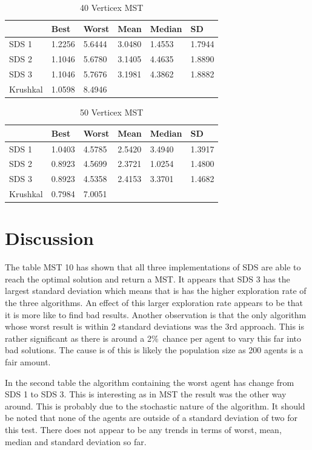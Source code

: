 \documentclass{AISB2008}
\begin{document}
{\begin{table}
\centering
\caption{40 Verticex MST}
\begin{tabular}{l|lllll}
	 	  & Best    & Worst    &   Mean  & Median & SD \\ \hline
SDS 1 & 1.2256	 & 5.6444  & 3.0480 & 1.4553 & 1.7944 \\
SDS 2 & 1.1046	 & 5.6780	& 3.1405 & 4.4635 & 1.8890 \\	
SDS 3 & 1.1046	 & 5.7676	& 3.1981 & 4.3862 & 1.8882 \\	
Krushkal      & 1.0598	 & 8.4946 \\
\end{tabular}
\end{table}

\begin{table}
\centering
\caption{50 Verticex MST}
\begin{tabular}{l|lllll}
	   & Best    & Worst    &   Mean  & Median & SD \\ \hline
SDS 1 &  1.0403 & 4.5785	& 2.5420	& 3.4940	& 1.3917 \\
SDS 2 & 0.8923	 & 4.5699	& 2.3721	& 1.0254	& 1.4800 \\	
SDS 3 & 0.8923	 & 4.5358	& 2.4153	& 3.3701	& 1.4682 \\	
Krushkal &	0.7984 &	7.0051 \\
\end{tabular}
\end{table}



\section{Discussion}

The table MST 10 has shown that all three implementations of SDS are able to reach the optimal solution and return a MST. It appears that SDS 3 has the largest standard deviation which means that is has the higher exploration rate of the three algorithms. An effect of this larger exploration rate appears to be that it is more like to find bad results. Another observation is that the only algorithm whose worst result is within 2 standard deviations was the 3rd approach. This is rather significant as there is around a 2\%\ chance per agent to vary this far into bad solutions. The cause is of this is likely the population size as 200 agents is a fair amount.

In the second table the algorithm containing the worst agent has change from SDS 1 to SDS 3. This is interesting as in MST the result was the other way around. This is probably due to the stochastic nature of the algorithm. It should be noted that none of the agents are outside of a standard deviation of two for this test. There does not appear to be any trends in terms of worst, mean, median and standard deviation so far.

}
\end{document}
